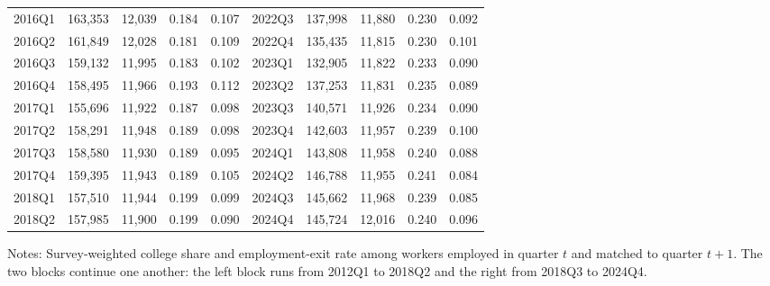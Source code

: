 \begin{table}[H]
\begin{threeparttable}
\begin{tabular}{lrrcc@{\hspace{1.5em}}lrrcc}
2016Q1 & 163,353 & 12,039 & 0.184 & 0.107 & 2022Q3 & 137,998 & 11,880 & 0.230 & 0.092 \\
2016Q2 & 161,849 & 12,028 & 0.181 & 0.109 & 2022Q4 & 135,435 & 11,815 & 0.230 & 0.101 \\
2016Q3 & 159,132 & 11,995 & 0.183 & 0.102 & 2023Q1 & 132,905 & 11,822 & 0.233 & 0.090 \\
2016Q4 & 158,495 & 11,966 & 0.193 & 0.112 & 2023Q2 & 137,253 & 11,831 & 0.235 & 0.089 \\
2017Q1 & 155,696 & 11,922 & 0.187 & 0.098 & 2023Q3 & 140,571 & 11,926 & 0.234 & 0.090 \\
2017Q2 & 158,291 & 11,948 & 0.189 & 0.098 & 2023Q4 & 142,603 & 11,957 & 0.239 & 0.100 \\
2017Q3 & 158,580 & 11,930 & 0.189 & 0.095 & 2024Q1 & 143,808 & 11,958 & 0.240 & 0.088 \\
2017Q4 & 159,395 & 11,943 & 0.189 & 0.105 & 2024Q2 & 146,788 & 11,955 & 0.241 & 0.084 \\
2018Q1 & 157,510 & 11,944 & 0.199 & 0.099 & 2024Q3 & 145,662 & 11,968 & 0.239 & 0.085 \\
2018Q2 & 157,985 & 11,900 & 0.199 & 0.090 & 2024Q4 & 145,724 & 12,016 & 0.240 & 0.096 \\
\bottomrule
\end{tabular}
\begin{tablenotes}[flushleft]\footnotesize
\item Notes: Survey-weighted college share and employment-exit rate among workers employed in quarter $t$ and matched to quarter $t+1$. The two blocks continue one another: the left block runs from 2012Q1 to 2018Q2 and the right from 2018Q3 to 2024Q4.
\end{tablenotes}
\end{threeparttable}
\end{table}
